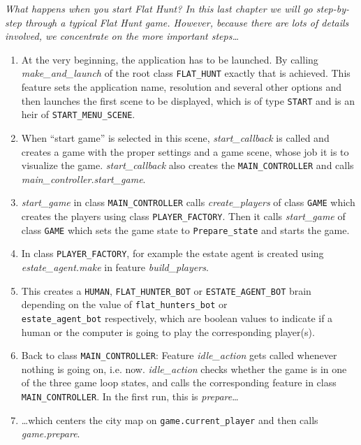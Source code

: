 \emph{What happens when you start \emph{Flat Hunt}? In this last chapter we will go step-by-step through a typical \emph{Flat Hunt} game. However, because there are lots of details involved, we concentrate on the more important steps\ldots}

\begin{enumerate}
  \item At the very beginning, the application has to be launched. By calling\\ \textit{make\_and\_launch} of the root class \texttt{FLAT\_HUNT} exactly that is achieved. This feature sets the application name, resolution and several other options and then launches the first scene to be displayed, which is of type \texttt{START} and is an heir of \texttt{START\_MENU\_SCENE}.
  \item When ``start game'' is selected in this scene, \textit{start\_callback} is called and creates a game with the proper settings and a game scene, whose job it is to visualize the game. \textit{start\_callback} also creates the \texttt{MAIN\_CONTROLLER} and calls \textit{main\_controller.start\_game}.
  \item \textit{start\_game} in class \texttt{MAIN\_CONTROLLER} calls \textit{create\_players} of class \texttt{GAME}  which creates the players using class \texttt{PLAYER\_FACTORY}. Then it calls \textit{start\_game} of class \texttt{GAME} which sets the game state to \texttt{Prepare\_state} and starts the game. 
  \item In class \texttt{PLAYER\_FACTORY}, for example the estate agent is created using \textit{estate\_agent.make} in feature \textit{build\_players}.
  \item This creates a \texttt{HUMAN}, \texttt{FLAT\_HUNTER\_BOT} or \texttt{ESTATE\_AGENT\_BOT} brain depending on the value of \texttt{flat\_hunters\_bot} or\\ \texttt{estate\_agent\_bot} respectively, which are boolean values to indicate if a human or the computer is going to play the corresponding player(s).
  \item Back to class \texttt{MAIN\_CONTROLLER}: Feature \textit{idle\_action} gets called whenever nothing is going on, i.e. now. \textit{idle\_action} checks whether the game is in one of the three game loop states, and calls the corresponding feature in class \texttt{MAIN\_CONTROLLER}. In the first run, this is \textit{prepare}\ldots
  \item \ldots which centers the city map on \texttt{game.current\_player} and then calls \textit{game.prepare}.

\end{enumerate}
